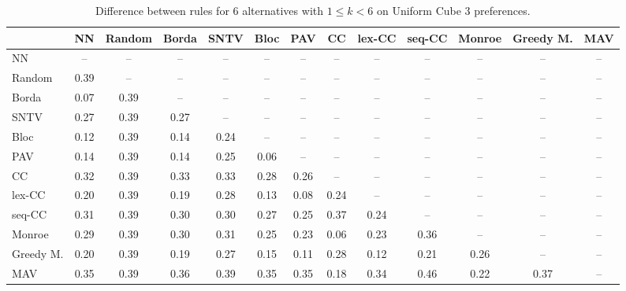 
\begin{table*}[h!]
\centering
\begin{tabular}{lcccccccccccc}
\toprule
 & NN & Random & Borda & SNTV & Bloc & PAV & CC & lex-CC & seq-CC & Monroe & Greedy M. & MAV \\
\midrule
NN & -- & -- & -- & -- & -- & -- & -- & -- & -- & -- & -- & -- \\
Random & 0.39 & -- & -- & -- & -- & -- & -- & -- & -- & -- & -- & -- \\
Borda & 0.07 & 0.39 & -- & -- & -- & -- & -- & -- & -- & -- & -- & -- \\
SNTV & 0.27 & 0.39 & 0.27 & -- & -- & -- & -- & -- & -- & -- & -- & -- \\
Bloc & 0.12 & 0.39 & 0.14 & 0.24 & -- & -- & -- & -- & -- & -- & -- & -- \\
PAV & 0.14 & 0.39 & 0.14 & 0.25 & 0.06 & -- & -- & -- & -- & -- & -- & -- \\
CC & 0.32 & 0.39 & 0.33 & 0.33 & 0.28 & 0.26 & -- & -- & -- & -- & -- & -- \\
lex-CC & 0.20 & 0.39 & 0.19 & 0.28 & 0.13 & 0.08 & 0.24 & -- & -- & -- & -- & -- \\
seq-CC & 0.31 & 0.39 & 0.30 & 0.30 & 0.27 & 0.25 & 0.37 & 0.24 & -- & -- & -- & -- \\
Monroe & 0.29 & 0.39 & 0.30 & 0.31 & 0.25 & 0.23 & 0.06 & 0.23 & 0.36 & -- & -- & -- \\
Greedy M. & 0.20 & 0.39 & 0.19 & 0.27 & 0.15 & 0.11 & 0.28 & 0.12 & 0.21 & 0.26 & -- & -- \\
MAV & 0.35 & 0.39 & 0.36 & 0.39 & 0.35 & 0.35 & 0.18 & 0.34 & 0.46 & 0.22 & 0.37 & -- \\
\bottomrule
\end{tabular}

\caption{Difference between rules for 6 alternatives with $1 \leq k < 6$ on Uniform Cube 3 preferences.}
\end{table*}
